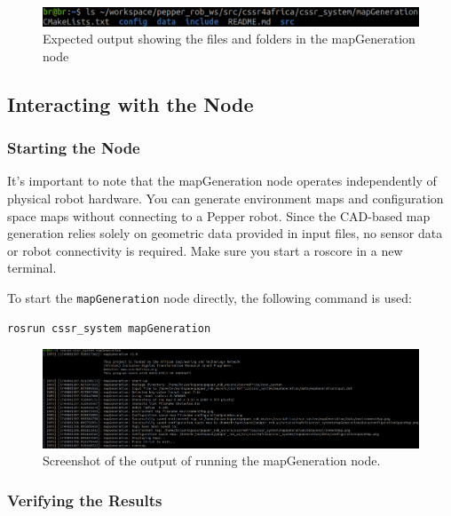 \documentclass{CSSRforAfrica}
\begin{document}
\begin{figure}[H]
    \centering
    \includegraphics[width=\linewidth]{images/mapGenerationFileDirectory.png}
    \caption{Expected output showing the files and folders in the mapGeneration node}
    \label{fig:map_generation_folder}
\end{figure}

\subsection{Interacting with the Node}

\subsubsection*{Starting the Node}
 It's important to note that the mapGeneration node operates independently of physical robot hardware. You can generate environment maps and configuration space maps without connecting to a Pepper robot. Since the CAD-based map generation relies solely on geometric data provided in input files, no sensor data or robot connectivity is required. Make sure you start a roscore in a new terminal.

\newpage 
\noindent To start the \texttt{mapGeneration} node directly, the following command is used:

\begin{lstlisting}[style=withoutNumbering, language=bash]
rosrun cssr_system mapGeneration
\end{lstlisting}
\begin{figure}[H]
    \centering
    \includegraphics[width=\linewidth]{images/mapGenerationOutput.png}
    \caption{Screenshot of the output of running the mapGeneration node.}
    \label{fig:map_generation_output}
\end{figure}

\subsubsection*{Verifying the Results}
\end{document}
